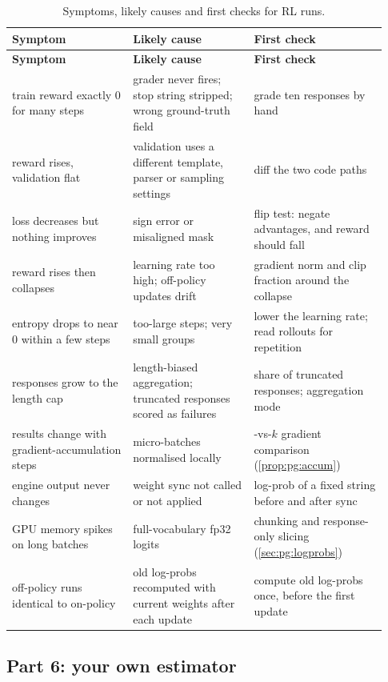 {\small
\begin{longtable}{@{}>{\raggedright\arraybackslash}p{0.3\linewidth}>{\raggedright\arraybackslash}p{0.3\linewidth}>{\raggedright\arraybackslash}p{0.33\linewidth}@{}}
\caption{Symptoms, likely causes and first checks for RL runs.}\label{tab:proj5:failures}\\
\toprule
\textbf{Symptom} & \textbf{Likely cause} & \textbf{First check}\\
\midrule\endfirsthead
\toprule
\textbf{Symptom} & \textbf{Likely cause} & \textbf{First check}\\
\midrule\endhead
train reward exactly 0 for many steps & grader never fires; stop string stripped; wrong ground-truth field & grade ten responses by hand\\
reward rises, validation flat & validation uses a different template, parser or sampling settings & diff the two code paths\\
loss decreases but nothing improves & sign error or misaligned mask & flip test: negate advantages, and reward should fall\\
reward rises then collapses & learning rate too high; off-policy updates drift & gradient norm and clip fraction around the collapse\\
entropy drops to near 0 within a few steps & too-large steps; very small groups & lower the learning rate; read rollouts for repetition\\
responses grow to the length cap & length-biased aggregation; truncated responses scored as failures & share of truncated responses; aggregation mode\\
results change with gradient-accumulation steps & micro-batches normalised locally & 1-vs-$k$ gradient comparison (\cref{prop:pg:accum})\\
engine output never changes & weight sync not called or not applied & log-prob of a fixed string before and after sync\\
GPU memory spikes on long batches & full-vocabulary fp32 logits & chunking and response-only slicing (\cref{sec:pg:logprobs})\\
off-policy runs identical to on-policy & old log-probs recomputed with current weights after each update & compute old log-probs once, before the first update\\
\bottomrule
\end{longtable}}

\subsection{Part 6: your own estimator}\label{sec:proj5:own}

